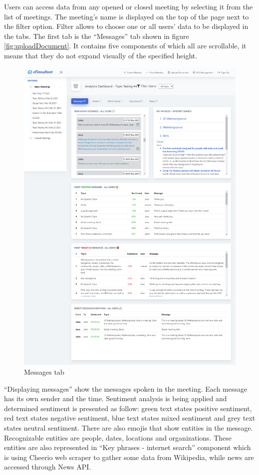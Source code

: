 \documentclass{article}
\begin{document}
{\large 
Users can access data from any opened or closed meeting by selecting it from the list of meetings. The meeting's name is displayed on the top of the page next to the filter option. Filter allows to choose one or all users' data to be displayed in the tabs. The first tab is the ``Messages'' tab shown in figure \ref{fig:uploadDocument}. It contains five components of which all are scrollable, it means that they do not expand visually of the specified height.\par
}

\begin{figure}[H]
  \centering
  \includegraphics[scale=0.29]{implementation/messagesTab.jpg}
  \caption{Messages tab}
  \label{fig:messagesTab}
\end{figure}

{\large ``Displaying messages'' show the messages spoken in the meeting. Each message has its own sender and the time. Sentiment analysis is being applied and determined sentiment is presented as follow:  green text states positive sentiment, red text states negative sentiment, blue text states mixed sentiment and grey text states neutral sentiment. There are also emojis that show entities in the message. Recognizable entities are people, dates, locations and organizations. These entities are also represented in ``Key phrases - internet search'' component which is using Cheerio web scraper to gather some data from Wikipedia, while news are accessed through News API.\par
}
\end{document}
